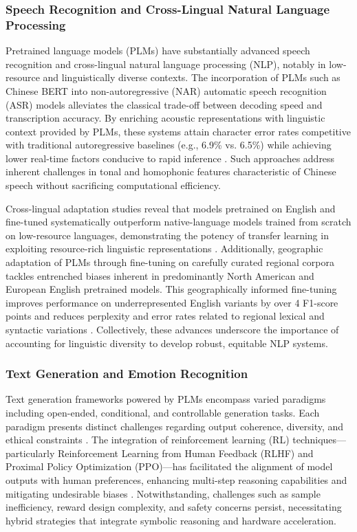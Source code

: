 \documentclass[sigconf]{acmart}
\begin{document}
\subsubsection{Speech Recognition and Cross-Lingual Natural Language Processing}

Pretrained language models (PLMs) have substantially advanced speech recognition and cross-lingual natural language processing (NLP), notably in low-resource and linguistically diverse contexts. The incorporation of PLMs such as Chinese BERT into non-autoregressive (NAR) automatic speech recognition (ASR) models alleviates the classical trade-off between decoding speed and transcription accuracy. By enriching acoustic representations with linguistic context provided by PLMs, these systems attain character error rates competitive with traditional autoregressive baselines (e.g., 6.9\% vs. 6.5\%) while achieving lower real-time factors conducive to rapid inference \cite{ref32}. Such approaches address inherent challenges in tonal and homophonic features characteristic of Chinese speech without sacrificing computational efficiency.

Cross-lingual adaptation studies reveal that models pretrained on English and fine-tuned systematically outperform native-language models trained from scratch on low-resource languages, demonstrating the potency of transfer learning in exploiting resource-rich linguistic representations \cite{ref31}. Additionally, geographic adaptation of PLMs through fine-tuning on carefully curated regional corpora tackles entrenched biases inherent in predominantly North American and European English pretrained models. This geographically informed fine-tuning improves performance on underrepresented English variants by over 4 F1-score points and reduces perplexity and error rates related to regional lexical and syntactic variations \cite{ref30}. Collectively, these advances underscore the importance of accounting for linguistic diversity to develop robust, equitable NLP systems.

\subsubsection{Text Generation and Emotion Recognition}

Text generation frameworks powered by PLMs encompass varied paradigms including open-ended, conditional, and controllable generation tasks. Each paradigm presents distinct challenges regarding output coherence, diversity, and ethical constraints \cite{ref39}. The integration of reinforcement learning (RL) techniques—particularly Reinforcement Learning from Human Feedback (RLHF) and Proximal Policy Optimization (PPO)—has facilitated the alignment of model outputs with human preferences, enhancing multi-step reasoning capabilities and mitigating undesirable biases \cite{ref9}. Notwithstanding, challenges such as sample inefficiency, reward design complexity, and safety concerns persist, necessitating hybrid strategies that integrate symbolic reasoning and hardware acceleration.
\end{document}
